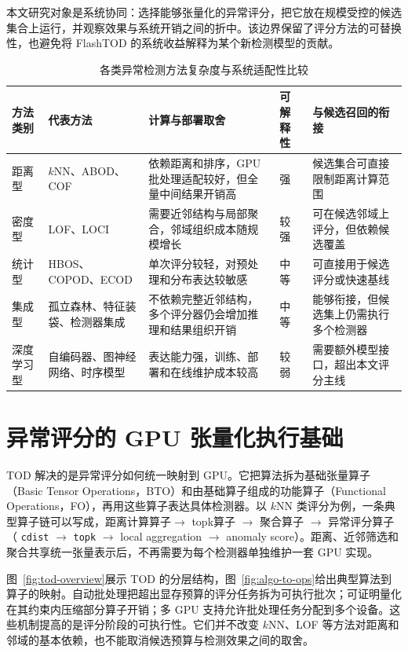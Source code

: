 本文研究对象是系统协同：选择能够张量化的异常评分，把它放在规模受控的候选集合上运行，并观察效果与系统开销之间的折中。该边界保留了评分方法的可替换性，也避免将 FlashTOD 的系统收益解释为某个新检测模型的贡献。

\begin{table}[htbp]
  \caption{各类异常检测方法复杂度与系统适配性比较}
  \label{tab:ad-complexity}
  \centering
  \small
  \setlength{\tabcolsep}{3pt}
  \renewcommand{\arraystretch}{1.25}
  \begin{tabularx}{\linewidth}{@{}P{1.65cm}P{2.55cm}Y P{1.7cm}Y@{}}
    \toprule
    方法类别 & 代表方法 & 计算与部署取舍 & 可解释性 & 与候选召回的衔接 \\
    \midrule
    距离型 & $k$NN、ABOD、COF & 依赖距离和排序，GPU 批处理适配较好，但全量中间结果开销高 & 强 & 候选集合可直接限制距离计算范围 \\
    密度型 & LOF、LOCI & 需要近邻结构与局部聚合，邻域组织成本随规模增长 & 较强 & 可在候选邻域上评分，但依赖候选覆盖 \\
    统计型 & HBOS、COPOD、ECOD & 单次评分较轻，对预处理和分布表达较敏感 & 中等 & 可直接用于候选评分或快速基线 \\
    集成型 & 孤立森林、特征装袋、检测器集成 & 不依赖完整近邻结构，多个评分器仍会增加推理和结果组织开销 & 中等 & 能够衔接，但候选集上仍需执行多个检测器 \\
    深度学习型 & 自编码器、图神经网络、时序模型 & 表达能力强，训练、部署和在线维护成本较高 & 较弱 & 需要额外模型接口，超出本文评分主线 \\
    \bottomrule
  \end{tabularx}
\end{table}

\section{异常评分的 GPU 张量化执行基础}

TOD 解决的是异常评分如何统一映射到 GPU。它把算法拆为基础张量算子（Basic Tensor Operations，BTO）和由基础算子组成的功能算子（Functional Operations，FO），再用这些算子表达具体检测器\citep{zhao2022tod}。以 $k$NN 类评分为例，一条典型算子链可以写成，距离计算算子$\rightarrow$ topk算子 $\rightarrow$ 聚合算子 $\rightarrow$ 异常评分算子（ \texttt{cdist} $\rightarrow$ \texttt{topk} $\rightarrow$ local aggregation $\rightarrow$ anomaly score）。距离、近邻筛选和聚合共享统一张量表示后，不再需要为每个检测器单独维护一套 GPU 实现。

图~\ref{fig:tod-overview}展示 TOD 的分层结构，图~\ref{fig:algo-to-ops}给出典型算法到算子的映射。自动批处理把超出显存预算的评分任务拆为可执行批次；可证明量化在其约束内压缩部分算子开销；多 GPU 支持允许批处理任务分配到多个设备。这些机制提高的是评分阶段的可执行性。它们并不改变 $k$NN、LOF 等方法对距离和邻域的基本依赖，也不能取消候选预算与检测效果之间的取舍\citep{zhao2022tod}。

